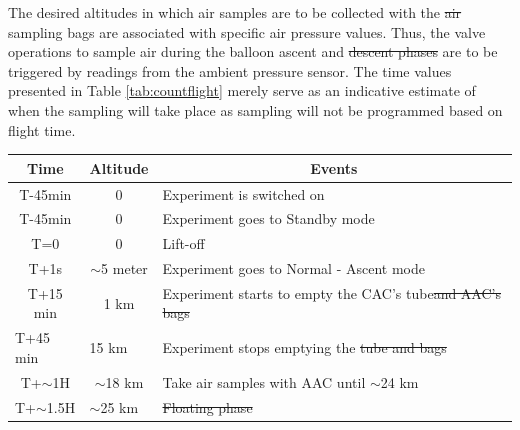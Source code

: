 \documentclass[a4paper,12pt,twoside, final]{article}
\providecommand{\DIFaddtex}[1]{{\protect\color{blue}\uwave{#1}}} %
\providecommand{\DIFdeltex}[1]{{\protect\color{red}\sout{#1}}}                      %
\providecommand{\DIFaddbegin}{} %
\providecommand{\DIFaddend}{} %
\providecommand{\DIFdelbegin}{} %
\providecommand{\DIFdelend}{} %
\providecommand{\DIFaddFL}[1]{\DIFadd{#1}} %
\providecommand{\DIFdelFL}[1]{\DIFdel{#1}} %
\providecommand{\DIFaddbeginFL}{} %
\providecommand{\DIFaddendFL}{} %
\providecommand{\DIFdelbeginFL}{} %
\providecommand{\DIFdelendFL}{} %
\providecommand{\DIFadd}[1]{\texorpdfstring{\DIFaddtex{#1}}{#1}} %
\providecommand{\DIFdel}[1]{\texorpdfstring{\DIFdeltex{#1}}{}} %
\newcommand{\DIFscaledelfig}{0.5}
\newlength{\DIFdelgraphicswidth} %
\newlength{\DIFdelgraphicsheight} %
\newcommand{\DIFaddincludegraphics}[2][]{{\color{blue}\fbox{\DIFOincludegraphics[#1]{#2}}}} %
\newcommand{\DIFdelincludegraphics}[2][]{%
\sbox{\DIFdelgraphicsbox}{\DIFOincludegraphics[#1]{#2}}%
\settoboxwidth{\DIFdelgraphicswidth}{\DIFdelgraphicsbox} %
\settoboxtotalheight{\DIFdelgraphicsheight}{\DIFdelgraphicsbox} %
\scalebox{\DIFscaledelfig}{%
\parbox[b]{\DIFdelgraphicswidth}{\usebox{\DIFdelgraphicsbox}\\[-\baselineskip] \rule{\DIFdelgraphicswidth}{0em}}\llap{\resizebox{\DIFdelgraphicswidth}{\DIFdelgraphicsheight}{%
\setlength{\unitlength}{\DIFdelgraphicswidth}%
\begin{picture}(1,1)%
\thicklines\linethickness{2pt} %
{\color[rgb]{1,0,0}\put(0,0){\framebox(1,1){}}}%
{\color[rgb]{1,0,0}\put(0,0){\line( 1,1){1}}}%
{\color[rgb]{1,0,0}\put(0,1){\line(1,-1){1}}}%
\end{picture}%
}\hspace*{3pt}}} %
} %
\DeclareRobustCommand{\DIFaddbegin}{\DIFOaddbegin \let\includegraphics\DIFaddincludegraphics} %
\DeclareRobustCommand{\DIFaddend}{\DIFOaddend \let\includegraphics\DIFOincludegraphics} %
\DeclareRobustCommand{\DIFdelbegin}{\DIFOdelbegin \let\includegraphics\DIFdelincludegraphics} %
\DeclareRobustCommand{\DIFdelend}{\DIFOaddend \let\includegraphics\DIFOincludegraphics} %
\DeclareRobustCommand{\DIFaddbeginFL}{\DIFOaddbeginFL \let\includegraphics\DIFaddincludegraphics} %
\DeclareRobustCommand{\DIFaddendFL}{\DIFOaddendFL \let\includegraphics\DIFOincludegraphics} %
\DeclareRobustCommand{\DIFdelbeginFL}{\DIFOdelbeginFL \let\includegraphics\DIFdelincludegraphics} %
\DeclareRobustCommand{\DIFdelendFL}{\DIFOaddendFL \let\includegraphics\DIFOincludegraphics} %
\begin{document}
The desired altitudes in which air samples are to be collected with the \DIFdelbegin \DIFdel{air }\DIFdelend sampling bags are associated with specific air pressure values. Thus, the valve operations to sample air during the balloon ascent and \DIFdelbegin \DIFdel{descent phases }\DIFdelend \DIFaddbegin \DIFadd{Descent Phases }\DIFaddend are to be triggered by readings from the ambient pressure sensor. The time values presented in Table \ref{tab:countflight} merely serve as an indicative estimate of when the sampling will take place as sampling will not be programmed based on flight time.

\begin{table}[H]
\centering


\begin{tabular}{|l|l|l|}
\hline
\multicolumn{1}{|c|}{\textbf{Time}}       & \multicolumn{1}{c|}{\textbf{Altitude}}      & \multicolumn{1}{c|}{\textbf{Events}}                              \\ \hline
\multicolumn{1}{|c|}{T-45min}    & \multicolumn{1}{c|}{0}             & Experiment is switched on                                \\ \hline
\multicolumn{1}{|c|}{T-45min}    & \multicolumn{1}{c|}{0}             & Experiment goes to Standby mode                          \\ \hline
\multicolumn{1}{|c|}{T=0}        & \multicolumn{1}{c|}{0}             & Lift-off                                                 \\ \hline
\multicolumn{1}{|c|}{T+1s}       & \multicolumn{1}{c|}{$\sim$5 meter} & Experiment goes to Normal - Ascent mode                  \\ \hline
\multicolumn{1}{|c|}{T+15 min}   & \multicolumn{1}{c|}{1 km}          & Experiment starts to empty the CAC's tube\DIFdelbeginFL \DIFdelFL{and AAC's bags }\DIFdelendFL \\ \hline
T+45 min                         & 15 km                              & Experiment stops emptying the \DIFdelbeginFL \DIFdelFL{tube and bags              }\DIFdelendFL \DIFaddbeginFL \DIFaddFL{tubes              }\DIFaddendFL \\ \hline
\multicolumn{1}{|c|}{T+$\sim$1H} & \multicolumn{1}{c|}{$\sim$18 km}   & Take air samples with AAC until $\sim$24 km                       \\ \hline
T+$\sim$1.5H                     & $\sim$25 km                        & \DIFdelbeginFL \DIFdelFL{Floating phase                                           }\DIFdelendFL \DIFaddbeginFL \DIFaddFL{Float Phase                                           }\DIFaddendFL \\ \hline

\end{tabular}
\end{table}
\end{document}
